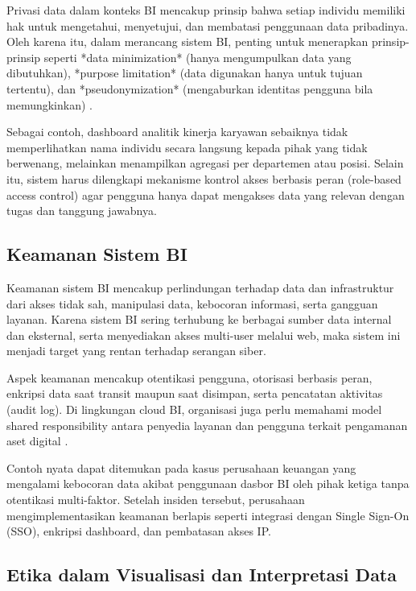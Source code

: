 Privasi data dalam konteks BI mencakup prinsip bahwa setiap individu memiliki hak untuk mengetahui, menyetujui, dan membatasi penggunaan data pribadinya. Oleh karena itu, dalam merancang sistem BI, penting untuk menerapkan prinsip-prinsip seperti *data minimization* (hanya mengumpulkan data yang dibutuhkan), *purpose limitation* (data digunakan hanya untuk tujuan tertentu), dan *pseudonymization* (mengaburkan identitas pengguna bila memungkinkan) \cite{hildebrandt2015privacy}.

Sebagai contoh, dashboard analitik kinerja karyawan sebaiknya tidak memperlihatkan nama individu secara langsung kepada pihak yang tidak berwenang, melainkan menampilkan agregasi per departemen atau posisi. Selain itu, sistem harus dilengkapi mekanisme kontrol akses berbasis peran (role-based access control) agar pengguna hanya dapat mengakses data yang relevan dengan tugas dan tanggung jawabnya.

\subsection{Keamanan Sistem BI}

Keamanan sistem BI mencakup perlindungan terhadap data dan infrastruktur dari akses tidak sah, manipulasi data, kebocoran informasi, serta gangguan layanan. Karena sistem BI sering terhubung ke berbagai sumber data internal dan eksternal, serta menyediakan akses multi-user melalui web, maka sistem ini menjadi target yang rentan terhadap serangan siber.

Aspek keamanan mencakup otentikasi pengguna, otorisasi berbasis peran, enkripsi data saat transit maupun saat disimpan, serta pencatatan aktivitas (audit log). Di lingkungan cloud BI, organisasi juga perlu memahami model shared responsibility antara penyedia layanan dan pengguna terkait pengamanan aset digital \cite{alpar2015biinfosec}.

Contoh nyata dapat ditemukan pada kasus perusahaan keuangan yang mengalami kebocoran data akibat penggunaan dasbor BI oleh pihak ketiga tanpa otentikasi multi-faktor. Setelah insiden tersebut, perusahaan mengimplementasikan keamanan berlapis seperti integrasi dengan Single Sign-On (SSO), enkripsi dashboard, dan pembatasan akses IP.

\subsection{Etika dalam Visualisasi dan Interpretasi Data}

